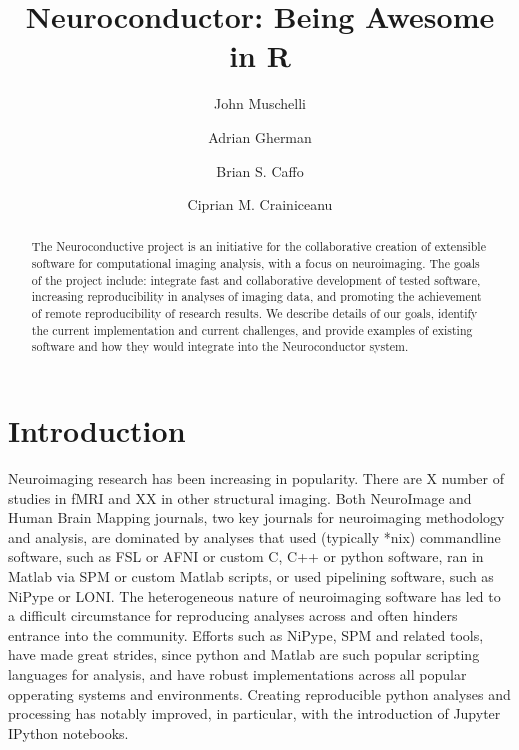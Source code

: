 \documentclass[]{elsarticle} %
\begin{document}
\begin{frontmatter}

  \title{Neuroconductor: Being Awesome in R}
    \author[JHU]{John Muschelli}
    \author[JHU]{Adrian Gherman}
  
    \author[JHU]{Brian S. Caffo}
  
    \author[JHU]{Ciprian M. Crainiceanu}
  
      \address[JHU]{Johns Hopkins Bloomberg School of Public Health, Department of
Biostatistics, 615 N Wolfe St, Baltimore, MD, 21205}
  
  \begin{abstract}
  The Neuroconductive project is an initiative for the collaborative
  creation of extensible software for computational imaging analysis, with
  a focus on neuroimaging. The goals of the project include: integrate
  fast and collaborative development of tested software, increasing
  reproducibility in analyses of imaging data, and promoting the
  achievement of remote reproducibility of research results. We describe
  details of our goals, identify the current implementation and current
  challenges, and provide examples of existing software and how they would
  integrate into the Neuroconductor system.
  \end{abstract}
  
 \end{frontmatter}

\section{Introduction}\label{introduction}

Neuroimaging research has been increasing in popularity. There are X
number of studies in fMRI and XX in other structural imaging. Both
NeuroImage and Human Brain Mapping journals, two key journals for
neuroimaging methodology and analysis, are dominated by analyses that
used (typically *nix) commandline software, such as FSL or AFNI or
custom C, C++ or python software, ran in Matlab via SPM or custom Matlab
scripts, or used pipelining software, such as NiPype or LONI. The
heterogeneous nature of neuroimaging software has led to a difficult
circumstance for reproducing analyses across and often hinders entrance
into the community. Efforts such as NiPype, SPM and related tools, have
made great strides, since python and Matlab are such popular scripting
languages for analysis, and have robust implementations across all
popular opperating systems and environments. Creating reproducible
python analyses and processing has notably improved, in particular, with
the introduction of Jupyter IPython notebooks.
\end{document}

